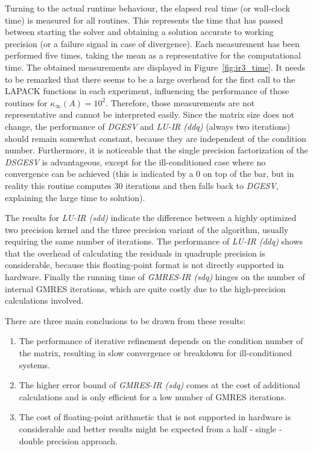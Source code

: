 Turning to the actual runtime behaviour, the elapsed real time (or wall-clock time) is measured for all routines. This represents the time that has passed between starting the solver and obtaining a solution accurate to working precision (or a failure signal in case of divergence). Each measurement has been performed five times, taking the mean as a representative for the computational time. The obtained measurements are displayed in Figure~\hyperref[fig:ir3_time]{\ref{fig:ir3_time}}. It needs to be remarked that there seems to be a large overhead for the first call to the LAPACK functions in each experiment, influencing the performance of those routines for $\kappa_\infty(A)=10^2$. Therefore, those measurements are not representative and cannot be interpreted easily. Since the matrix size does not change, the performance of \textit{DGESV} and \textit{LU-IR (ddq)} (always two iterations) should remain somewhat constant, because they are independent of the condition number. Furthermore, it is noticeable that the single precision factorization of the \textit{DSGESV} is advantageous, except for the ill-conditioned case where no convergence can be achieved (this is indicated by a $0$ on top of the bar, but in reality this routine computes 30 iterations and then falls back to \textit{DGESV}, explaining the large time to solution).

The results for \textit{LU-IR (sdd)} indicate the difference between a highly optimized two precision kernel and the three precision variant of the algorithm, usually requiring the same number of iterations. The performance of \textit{LU-IR (ddq)} shows that the overhead of calculating the residuals in quadruple precision is considerable, because this floating-point format is not directly supported in hardware. Finally the running time of \textit{GMRES-IR (sdq)} hinges on the number of internal GMRES iterations, which are quite costly due to the high-precision calculations involved. 

There are three main conclusions to be drawn from these results:
\begin{enumerate}
    \item The performance of iterative refinement depends on the condition number of the matrix, resulting in slow convergence or breakdown for ill-conditioned systems.
    \item The higher error bound of \textit{GMRES-IR (sdq)} comes at the cost of additional calculations and is only efficient for a low number of GMRES iterations.
    \item The cost of floating-point arithmetic that is not supported in hardware is considerable and better results might be expected from a half - single - double precision approach.
\end{enumerate}


